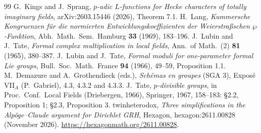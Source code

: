 \documentclass[11pt]{amsart}
\theoremstyle{definition}
\theoremstyle{remark}
\begin{document}
\begin{thebibliography}{99}
 G.~Kings and J.~Sprang, \emph{$p$-adic $L$-functions for Hecke characters of totally imaginary fields}, arXiv:2603.15446 (2026), Theorem 7.1.
 H.~Lang, \emph{Kummersche Kongruenzen f\"ur die normierten Entwicklungskoeffizienten der Weierstra\ss schen $\wp$-Funktion}, Abh.\ Math.\ Sem.\ Hamburg \textbf{33} (1969), 183--196.
 J.~Lubin and J.~Tate, \emph{Formal complex multiplication in local fields}, Ann.\ of Math.\ (2) \textbf{81} (1965), 380--387.
 J.~Lubin and J.~Tate, \emph{Formal moduli for one-parameter formal Lie groups}, Bull.\ Soc.\ Math.\ France \textbf{94} (1966), 49--59, Proposition 1.1.
 M.~Demazure and A.~Grothendieck (eds.), \emph{Sch\'emas en groupes} (SGA 3), Expos\'e VII$_A$ (P.~Gabriel), 4.3, 4.3.2 and 4.3.3.
 J.~Tate, \emph{$p$-divisible groups}, in Proc.\ Conf.\ Local Fields (Driebergen, 1966), Springer, 1967, 158--183: \S2.2, Proposition 1; \S2.3, Proposition 3.
 twinheterodox, \emph{Three simplifications in the Alp\"oge--Claude argument for Dirichlet GRH}, Hexagon, hexagon:2611.00828 (November 2026). \url{https://hexagonmath.org/2611.00828}.
\end{thebibliography}
\end{document}
